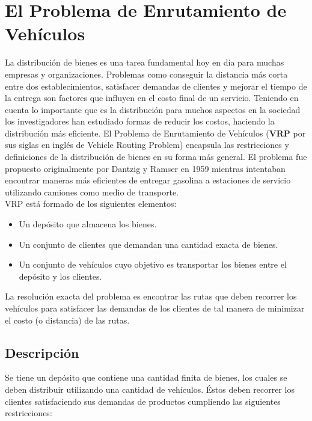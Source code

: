 \chapter{El Problema de Enrutamiento de Vehículos} \label{chap:vrp}


La distribución de bienes es una tarea fundamental hoy en día para muchas empresas y organizaciones. Pro\-ble\-mas como conseguir la distancia más corta entre dos establecimientos, satisfacer demandas de clientes y mejorar el tiempo de la entrega son factores que influyen en el costo final de un servicio. Teniendo en cuenta lo importante que es la distribución para muchos aspectos en la sociedad los investigadores han estudiado formas de reducir los costos, haciendo la distribución más eficiente. El Problema de Enrutamiento de Vehículos (\textbf{VRP} por sus siglas en inglés de Vehicle Routing Problem) encapsula las restricciones y definiciones de la distribución de bienes en su forma más general. El problema fue propuesto originalmente por Dantzig y Ramser en 1959 \cite{primervrp} mientras intentaban encontrar maneras más eficientes de entregar gasolina a estaciones de servicio utilizando camiones como medio de transporte. \\

VRP está formado de los siguientes elementos:
\begin{itemize}
	
	\item Un depósito que almacena los bienes.
	\item Un conjunto de clientes que demandan una cantidad exacta de bienes.
	\item Un conjunto de vehículos cuyo objetivo es transportar los bienes entre el depósito y los clientes.

\end{itemize}

La resolución exacta del problema es encontrar las rutas que deben recorrer los vehículos para satisfacer las demandas de los clientes de tal manera de minimizar el costo (o distancia) de las rutas.

\section{Descripción} \label{sect:descripcion}

Se tiene un depósito que contiene una cantidad finita de bienes, los cuales se deben distribuir utilizando una cantidad de vehículos. Éstos deben recorrer los clientes satisfaciendo sus demandas de productos cumpliendo las siguientes restricciones:

